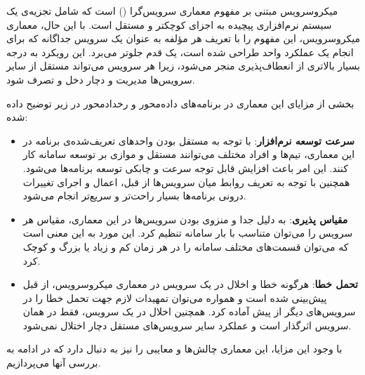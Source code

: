 میکروسرویس مبتنی بر مفهوم معماری سرویس‌گرا () است که شامل تجزیه‌ی یک سیستم نرم‌افزاری پیچیده به اجزای کوچکتر و مستقل است. با این حال، معماری میکروسرویس، این مفهوم را با تعریف هر مؤلفه به عنوان یک سرویس جداگانه که برای انجام یک عملکرد واحد طراحی شده است، یک قدم جلوتر می‌برد. این رویکرد به درجه بسیار بالاتری از انعطاف‌پذیری منجر می‌شود، زیرا هر سرویس می‌تواند مستقل از سایر سرویس‌ها مدیریت و دچار دخل و تصرف شود.

بخشی از مزایای این معماری در برنامه‌های داده‌محور و رخداد‌محور  در زیر توضیح داده شده\cite{Hightower2017}\cite{Fowler2014}:
\begin{itemize}
\item \textbf{سرعت توسعه نرم‌افزار}: با توجه به مستقل بودن واحد‌های تعریف‌شده‌ی برنامه در این معماری، تیم‌ها و افراد مختلف می‌توانند مستقل و موازی بر توسعه سامانه کار کنند. این امر باعث افزایش قابل توجه سرعت و چابکی توسعه برنامه‌ها می‌شود. همچنین با توجه به تعریف روابط میان سرویس‌ها از قبل، اعمال و اجرای تغییرات درونی برنامه‌ها بسیار راحت‌تر و سریع‌تر انجام می‌شود.

\item \textbf{مقیاس پذیری}: به دلیل جدا و منزوی بودن سرویس‌ها در این معماری، مقیاس هر سرویس را می‌توان متناسب با بار سامانه تنظیم کرد. این مورد به این معنی است که می‌توان قسمت‌های مختلف سامانه را در هر زمان کم و زیاد یا بزرگ و کوچک کرد.

\item \textbf{تحمل خطا}: هرگونه خطا و اخلال در یک سرویس در معماری میکروسرویس، از قبل پیش‌بینی شده است و همواره می‌توان تمهیدات لازم جهت تحمل خطا را در سرویس‌های دیگر از پیش آماده کرد. همچنین اخلال در یک سرویس، فقط در همان سرویس اثرگذار است و عملکرد سایر سرویس‌های مستقل دچار اختلال نمی‌شود.

\end{itemize}

با وجود این مزایا، این معماری چالش‌ها و معایبی را نیز به دنبال دارد\cite{Hightower2017}\cite{Fowler2014} که در ادامه به بررسی آنها می‌پردازیم.

